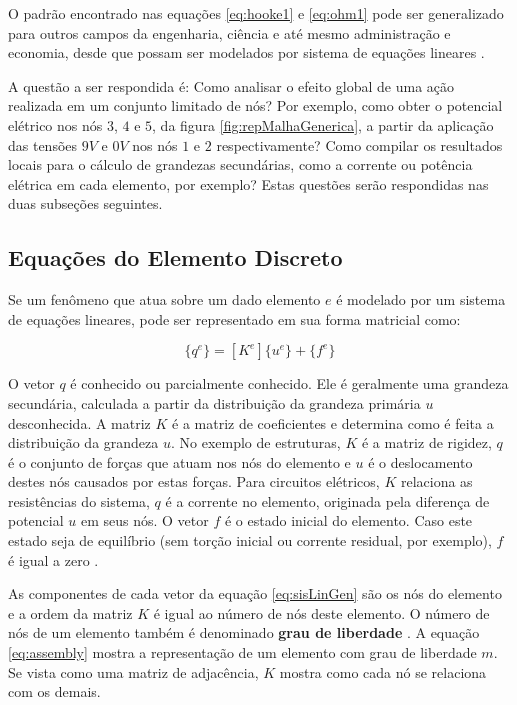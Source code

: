 \documentclass[
    12pt,               %
    openright,          %
    oneside,
    a4paper,            %
    english,            %
    french,             %
    spanish,            %
    brazil              %
    ]{abntex2}
\begin{document}
O padrão encontrado nas equações \ref{eq:hooke1} e \ref{eq:ohm1} pode ser generalizado para outros campos da engenharia, ciência e até mesmo administração e economia, desde que possam ser modelados por sistema de equações lineares \cite[p. 331]{burdenFaires}.

A questão a ser respondida é: Como analisar o efeito global de uma ação realizada em um conjunto limitado de nós? Por exemplo, como obter o potencial elétrico nos nós $3$, $4$ e $5$, da figura \ref{fig:repMalhaGenerica}, a partir da aplicação das tensões $9V$ e $0V$ nos nós $1$ e $2$ respectivamente? Como compilar os resultados locais  para o cálculo de grandezas secundárias, como a corrente ou potência elétrica em cada elemento, por exemplo? Estas questões serão respondidas nas duas subseções seguintes.


\subsection{Equações do Elemento Discreto}

Se um fenômeno que atua sobre um dado elemento $e$ é modelado por um sistema de equações lineares,  pode ser representado em sua forma matricial como:

 \begin{equation}
 \label{eq:sisLinGen}
    \{q^e\} = [K^e] \{u^e\} + \{f^e\}
 \end{equation}
 
O vetor $q$ é conhecido ou parcialmente conhecido. Ele é geralmente uma grandeza secundária, calculada a partir da distribuição da grandeza primária $u$ desconhecida. A matriz $K$ é a matriz de coeficientes e determina como é feita a distribuição da grandeza $u$. No exemplo de estruturas, $K$ é a matriz de rigidez, $q$ é o conjunto de forças que atuam nos nós do elemento e $u$ é o deslocamento destes nós causados por estas forças. Para circuitos elétricos, $K$ relaciona as resistências do sistema, $q$ é a corrente no elemento, originada pela diferença de potencial $u$ em seus nós. O vetor $f$ é o estado inicial do elemento. Caso este estado seja de equilíbrio (sem torção inicial ou corrente residual, por exemplo), $f$ é igual a zero \cite[p. 7]{zien}.

As componentes de cada vetor da equação \ref{eq:sisLinGen} são os nós do elemento e a ordem da matriz $K$ é igual ao número de nós deste elemento. O número de nós de um elemento também é denominado \textbf{grau de liberdade} \cite[p. 5]{zien}. A equação \ref{eq:assembly} mostra a representação de um elemento com grau de liberdade  $m$. Se vista como uma matriz de adjacência, $K$ mostra como cada nó se relaciona com os demais. 
 
\end{document}
